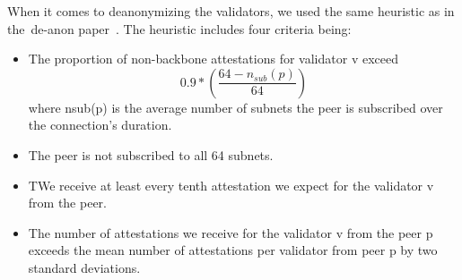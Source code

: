 When it comes to deanonymizing the validators,
we used the same heuristic as in the~\gls{de-anon paper}~\cite{heimbach2024deanonymizingethereumvalidatorsp2p}.
The heuristic includes four criteria being:
\begin{itemize}
    \item The proportion of non-backbone attestations for validator v exceed
    \begin{equation}
        0.9*\left(\frac{64-n_{sub}(p)}{64}\right)
        \label{eq:heurestic}
    \end{equation} where nsub(p) is the average number of subnets the peer is subscribed over the connection’s duration.
    \item The peer is not subscribed to all 64 subnets.
    \item TWe receive at least every tenth attestation we expect for the validator v from the peer.
    \item The number of attestations we receive for the validator v from the peer p exceeds the mean number of attestations per validator from peer p by two standard deviations.
\end{itemize}